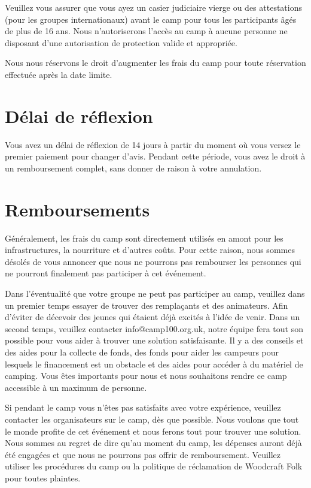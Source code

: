 \documentclass[a4paper, 11pt]{report}
\begin{document}
Veuillez vous assurer que vous ayez un casier judiciaire vierge ou des attestations (pour les groupes internationaux) avant le camp pour tous les participants \^ag\'es de plus de 16 ans. Nous n'autoriserons l'acc\`es au camp \`a aucune personne ne disposant d'une autorisation de protection valide et appropri\'ee. 

Nous nous r\'eservons le droit d'augmenter les frais du camp pour toute r\'eservation effectu\'ee apr\`es la date limite. 


\section{D\'elai de r\'eflexion}
Vous avez un d\'elai de r\'eflexion de 14 jours \`a partir du moment où vous versez le premier paiement pour changer d'avis. Pendant cette p\'eriode, vous avez le droit \`a un remboursement complet, sans donner de raison \`a votre annulation.

\section{Remboursements}
G\'en\'eralement, les frais du camp sont directement utilis\'es en amont pour les infrastructures, la nourriture et d'autres coûts. Pour cette raison, nous sommes d\'esol\'es de vous annoncer que nous ne pourrons pas rembourser les personnes qui ne pourront finalement pas participer \`a cet \'ev\'enement.

Dans l'\'eventualit\'e que votre groupe ne peut pas participer au camp, veuillez dans un premier temps essayer de trouver des remplaçants et des animateurs. Afin d'\'eviter de d\'ecevoir des jeunes qui \'etaient d\'ej\`a excit\'es \`a l'id\'ee de venir. Dans un second temps, veuillez contacter info@camp100.org.uk, notre \'equipe fera tout son possible pour vous aider \`a trouver une solution satisfaisante. Il y a des conseils et des aides pour la collecte de fonds, des fonds pour aider les campeurs pour lesquels le financement est un obstacle et des aides pour acc\'eder \`a du mat\'eriel de camping. Vous êtes importants pour nous et nous souhaitons rendre ce camp accessible \`a un maximum de personne.
 
Si pendant le camp vous n'êtes pas satisfaits avec votre exp\'erience, veuillez contacter les organisateurs sur le camp, d\`es que possible. Nous voulons que tout le monde profite de cet \'ev\'enement et nous ferons tout pour trouver une solution. Nous sommes au regret de dire qu'au moment du camp, les d\'epenses auront d\'ej\`a \'et\'e engag\'ees et que nous ne pourrons pas offrir de remboursement. Veuillez utiliser les proc\'edures du camp ou la politique de r\'eclamation de Woodcraft Folk pour toutes plaintes.
\end{document}
